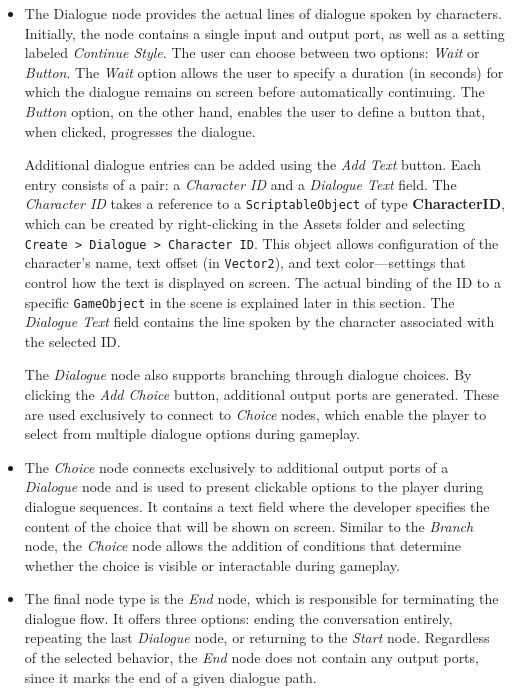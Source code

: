 \begin{itemize}
    \item The Dialogue node provides the actual lines of dialogue spoken by characters. Initially, the node contains a single input and output port, as well as a setting labeled \textit{Continue Style}. The user can choose between two options: \textit{Wait} or \textit{Button}. The \textit{Wait} option allows the user to specify a duration (in seconds) for which the dialogue remains on screen before automatically continuing. The \textit{Button} option, on the other hand, enables the user to define a button that, when clicked, progresses the dialogue.

Additional dialogue entries can be added using the \textit{Add Text} button. Each entry consists of a pair: a \textit{Character ID} and a \textit{Dialogue Text} field. The \textit{Character ID} takes a reference to a \verb|ScriptableObject| of type \textbf{CharacterID}, which can be created by right-clicking in the Assets folder and selecting \verb|Create > Dialogue > Character ID|. This object allows configuration of the character's name, text offset (in \verb|Vector2|), and text color—settings that control how the text is displayed on screen. The actual binding of the ID to a specific \verb|GameObject| in the scene is explained later in this section. The \textit{Dialogue Text} field contains the line spoken by the character associated with the selected ID.

The \textit{Dialogue} node also supports branching through dialogue choices. By clicking the \textit{Add Choice} button, additional output ports are generated. These are used exclusively to connect to \textit{Choice} nodes, which enable the player to select from multiple dialogue options during gameplay.

    \item The \textit{Choice} node connects exclusively to additional output ports of a \textit{Dialogue} node and is used to present clickable options to the player during dialogue sequences. It contains a text field where the developer specifies the content of the choice that will be shown on screen. Similar to the \textit{Branch} node, the \textit{Choice} node allows the addition of conditions that determine whether the choice is visible or interactable during gameplay. 
    \item  The final node type is the \textit{End} node, which is responsible for terminating the dialogue flow. It offers three options: ending the conversation entirely, repeating the last \textit{Dialogue} node, or returning to the \textit{Start} node. Regardless of the selected behavior, the \textit{End} node does not contain any output ports, since it marks the end of a given dialogue path. 
\end{itemize}
